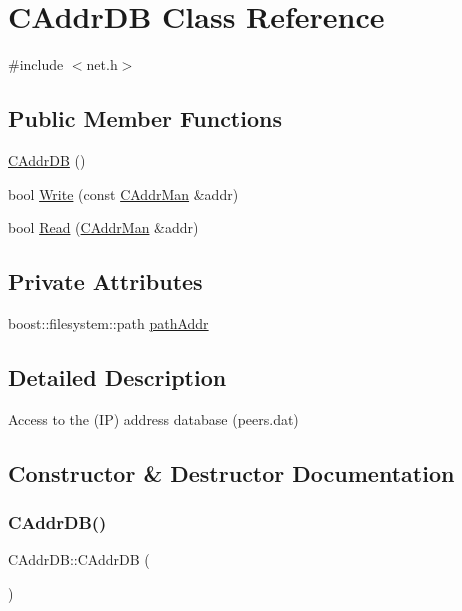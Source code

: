 \hypertarget{class_c_addr_d_b}{}\section{C\+Addr\+DB Class Reference}
\label{class_c_addr_d_b}


{\ttfamily \#include $<$net.\+h$>$}

\subsection*{Public Member Functions}
\begin{DoxyCompactItemize}
\item 
\mbox{\hyperlink{class_c_addr_d_b_af8c039f1904b1892c5a14e484a5b31a7}{C\+Addr\+DB}} ()
\item 
bool \mbox{\hyperlink{class_c_addr_d_b_aaec90dba59cd69a2f25bc5630a1dde39}{Write}} (const \mbox{\hyperlink{class_c_addr_man}{C\+Addr\+Man}} \&addr)
\item 
bool \mbox{\hyperlink{class_c_addr_d_b_aed4b567fb7c2dd15b2856e7c769967b7}{Read}} (\mbox{\hyperlink{class_c_addr_man}{C\+Addr\+Man}} \&addr)
\end{DoxyCompactItemize}
\subsection*{Private Attributes}
\begin{DoxyCompactItemize}
\item 
boost\+::filesystem\+::path \mbox{\hyperlink{class_c_addr_d_b_afeba63488deb50f5aac678a890d41a0d}{path\+Addr}}
\end{DoxyCompactItemize}


\subsection{Detailed Description}
Access to the (IP) address database (peers.\+dat) 

\subsection{Constructor \& Destructor Documentation}
\mbox{\label{class_c_addr_d_b_af8c039f1904b1892c5a14e484a5b31a7}} 
\subsubsection{\texorpdfstring{C\+Addr\+D\+B()}{CAddrDB()}}
{\footnotesize\ttfamily C\+Addr\+D\+B\+::\+C\+Addr\+DB (\begin{DoxyParamCaption}{ }\end{DoxyParamCaption})}



